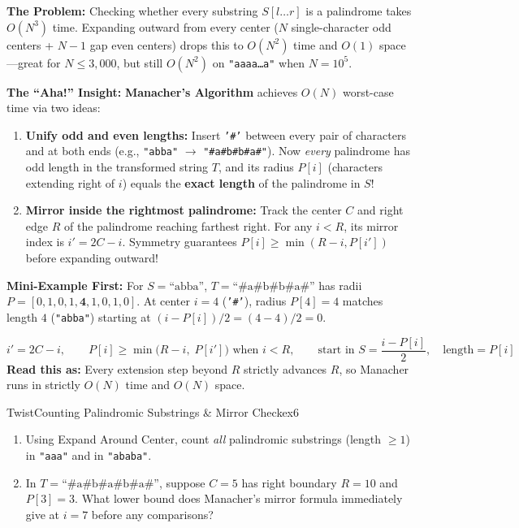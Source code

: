 \documentclass[11pt,a4paper]{article}
\theoremstyle{definition}
\newcommand{\painbeat}{\textbf{\color{accentamber}The Problem:} }
\newcommand{\ahabeat}{\textbf{\color{accentteal}The ``Aha!'' Insight:} }
\newcommand{\examplebeat}{\textbf{\color{primaryblue}Mini-Example First:} }
\begin{document}
\painbeat Checking whether every substring $S[l \dots r]$ is a palindrome takes $O(N^3)$ time. Expanding outward from every center ($N$ single-character odd centers + $N - 1$ gap even centers) drops this to $O(N^2)$ time and $O(1)$ space---great for $N \le 3{,}000$, but still $O(N^2)$ on \texttt{"aaaa\dots a"} when $N = 10^5$.

\ahabeat \textbf{Manacher's Algorithm} achieves $O(N)$ worst-case time via two ideas:
\begin{enumerate}
    \item \textbf{Unify odd and even lengths:} Insert \texttt{'\#'} between every pair of characters and at both ends (e.g., \texttt{"abba"} $\to$ \texttt{"\#a\#b\#b\#a\#"}). Now \emph{every} palindrome has odd length in the transformed string $T$, and its radius $P[i]$ (characters extending right of $i$) equals the \textbf{exact length} of the palindrome in $S$!
    \item \textbf{Mirror inside the rightmost palindrome:} Track the center $C$ and right edge $R$ of the palindrome reaching farthest right. For any $i < R$, its mirror index is $i' = 2C - i$. Symmetry guarantees $P[i] \ge \min(R - i, P[i'])$ before expanding outward!
\end{enumerate}

\examplebeat For $S = \text{``abba''}$, $T = \text{``\#a\#b\#b\#a\#''}$ has radii $P = [0, 1, 0, 1, \mathbf{4}, 1, 0, 1, 0]$. At center $i = 4$ (\texttt{'\#'}), radius $P[4] = 4$ matches length $4$ (\texttt{"abba"}) starting at $(i - P[i])/2 = (4 - 4)/2 = 0$.

\begin{formulabox}
\[
    i' = 2C - i, \qquad
    P[i] \ge \min\bigl(R - i,\; P[i']\bigr) \text{ when } i < R, \qquad
    \text{start in } S = \frac{i - P[i]}{2},\quad \text{length} = P[i]
\]
\textbf{Read this as:} Every extension step beyond $R$ strictly advances $R$, so Manacher runs in strictly $O(N)$ time and $O(N)$ space.
\end{formulabox}

\begin{tryitbox}{Twist}{Counting Palindromic Substrings \& Mirror Check}{ex6}
\begin{enumerate}
    \item Using Expand Around Center, count \emph{all} palindromic substrings (length $\ge 1$) in \texttt{"aaa"} and in \texttt{"ababa"}.
    \item In $T = \text{``\#a\#b\#a\#b\#a\#''}$, suppose $C = 5$ has right boundary $R = 10$ and $P[3] = 3$. What lower bound does Manacher's mirror formula immediately give at $i = 7$ before any comparisons?
\end{enumerate}
\end{tryitbox}
\end{document}
